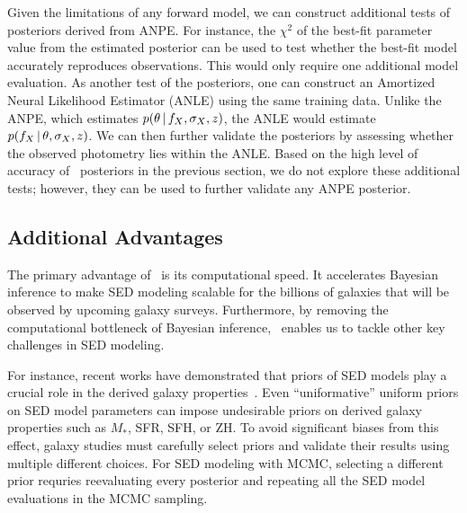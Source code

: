 Given the limitations of any forward model, we can construct additional tests
of posteriors derived from ANPE. 
For instance, the $\chi^2$ of the best-fit parameter value from the 
estimated posterior can be used to test whether the best-fit model 
accurately reproduces observations.
This would only require one additional model evaluation. 
As another test of the posteriors, one can construct an Amortized Neural
Likelihood Estimator (ANLE) using the same training data. 
Unlike the ANPE, which estimates $p(\theta\,|\, f_X, \sigma_X, z)$, the ANLE
would estimate $p(f_X \,|\, \theta, \sigma_X, z)$.
We can then further validate the posteriors by assessing whether the observed
photometry lies within the ANLE. 
Based on the high level of accuracy of \sedflow~posteriors in the previous
section, we do not explore these additional tests; however, they can be used to
further validate any ANPE posterior. 

\subsection{Additional Advantages} 
The primary advantage of \sedflow~is its computational speed. 
It accelerates Bayesian inference to make SED modeling scalable for the
billions of galaxies that will be observed by upcoming galaxy surveys. 
Furthermore, by removing the computational bottleneck of Bayesian inference,
\sedflow~enables us to tackle other key challenges in SED modeling.  

For instance, recent works have demonstrated that priors of SED models play a
crucial role in the derived galaxy properties~\citep{carnall2018, leja2019,
hahn2022}. 
Even ``uniformative'' uniform priors on SED model parameters can impose
undesirable priors on derived galaxy properties such as $M_*$, SFR, SFH, or
ZH.
To avoid significant biases from this effect, galaxy studies must carefully
select priors and validate their results using multiple different choices. 
For SED modeling with MCMC, selecting a different prior requries reevaluating
every posterior and repeating all the SED model evaluations in the MCMC
sampling.  

